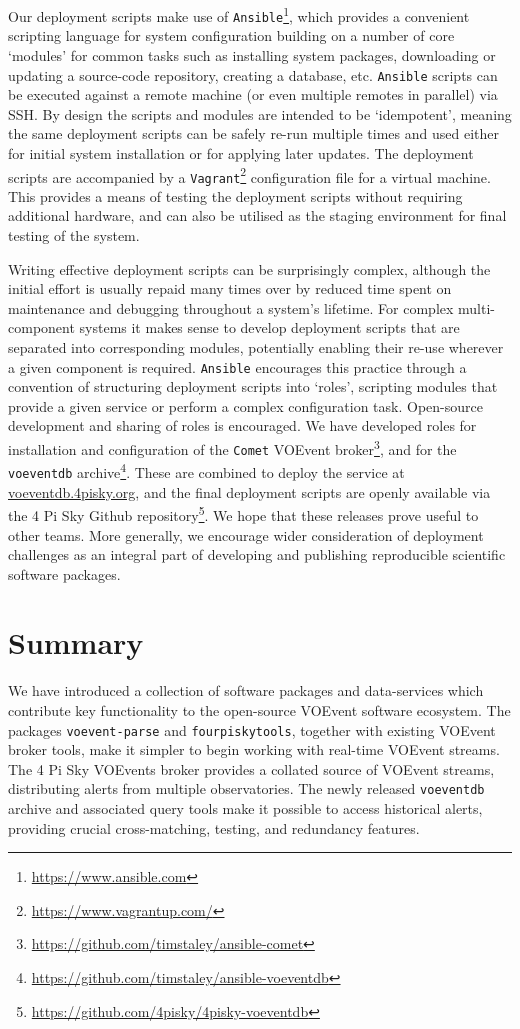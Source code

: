 \documentclass[5p,authoryear]{elsarticle}
\begin{document}
Our deployment scripts make use of \texttt{Ansible}\footnote{\url{https://www.ansible.com}}, which provides a convenient scripting language for system configuration building on a number of core `modules' for common tasks such as installing system packages, downloading or updating a source-code repository, creating a database, etc.
\texttt{Ansible} scripts can be executed against a remote machine (or even multiple remotes in parallel) via SSH.
By design the scripts and modules are intended to be `idempotent', meaning the same deployment scripts can be safely re-run multiple times and used either for initial system installation or for applying later updates. 
The deployment scripts are accompanied by a \texttt{Vagrant}\footnote{\url{https://www.vagrantup.com/}} configuration file for a virtual machine. 
This provides a means of testing the deployment scripts without requiring additional hardware, and can also be utilised as the staging environment for final testing of the system.

Writing effective deployment scripts can be surprisingly complex, although the initial effort is usually repaid many times over by reduced time spent on maintenance and debugging throughout a system's lifetime. 
For complex multi-component systems it makes sense to develop deployment scripts that are separated into corresponding modules, potentially enabling their re-use wherever a given component is required. 
\texttt{Ansible} encourages this practice through a convention of structuring deployment scripts into `roles', scripting modules that provide a given service or perform a complex configuration task. 
Open-source development and sharing of roles is encouraged. 
We have developed roles for installation and configuration of the \texttt{Comet} VOEvent broker\footnote{\url{https://github.com/timstaley/ansible-comet}}, and for the \texttt{voeventdb} archive\footnote{\url{https://github.com/timstaley/ansible-voeventdb}}. 
These are combined to deploy the service at \url{voeventdb.4pisky.org}, and the final deployment scripts are openly available via the 4 Pi Sky Github repository\footnote{\url{https://github.com/4pisky/4pisky-voeventdb}}. 
We hope that these releases prove useful to other teams. 
More generally, we encourage wider consideration of deployment challenges as an integral part of developing and publishing reproducible scientific software packages.

\section{Summary}
We have introduced a collection of software packages and data-services which contribute key functionality to the open-source VOEvent software ecosystem. The packages \texttt{voevent-parse} and \texttt{fourpiskytools}, together with existing VOEvent broker tools, make it simpler to begin working with real-time VOEvent streams. The 4 Pi Sky VOEvents broker provides a collated source of VOEvent streams, distributing alerts from multiple observatories. The newly released \texttt{voeventdb} archive and associated query tools make it possible to access historical alerts, providing crucial cross-matching, testing, and redundancy features.
\end{document}
